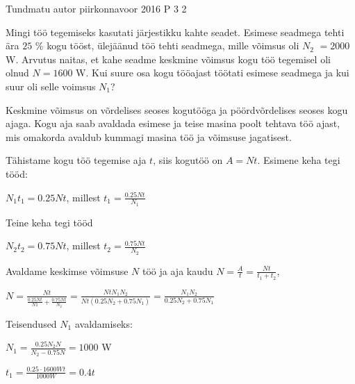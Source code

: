 {Tundmatu autor} %
{piirkonnavoor} %
{2016} %
{P 3} %
{2} %
{
\ifStatement
Mingi töö tegemiseks kasutati järjestikku kahte seadet. Esimese seadmega tehti ära $25$ \% kogu tööst, ülejäänud töö tehti seadmega, mille võimsus oli $N_2$ $= 2000$ W. Arvutus naitas, et kahe seadme keskmine võimsus kogu töö tegemisel oli olnud $N = 1600$ W. Kui suure osa kogu tööajast töötati esimese seadmega ja kui suur oli selle voimsus $N_1$?
\fi


\ifHint
Keskmine võimsus on võrdelises seoses kogutööga ja pöördvõrdelises seoses kogu ajaga. Kogu aja saab avaldada esimese ja teise masina poolt tehtava töö ajast, mis omakorda avaldub kummagi masina töö ja võimsuse jagatisest.
\fi

\ifSolution
Tähistame kogu töö tegemise aja $t$, siis kogutöö on $A = Nt$. Esimene keha tegi tööd:
\begin{center}
$N_1 t_1 = 0.25Nt$, millest $t_1 = \frac{0.25Nt}{N_1}$
\end{center}
Teine keha tegi tööd
\begin{center}
$N_2t_2 = 0.75Nt$, millest $t_2 = \frac{0.75Nt}{N_2}$
\end{center}
Avaldame keskimse võimsuse $N$ töö ja aja kaudu $N = \frac{A}{t} = \frac{Nt}{t_1 + t_2}$,
\begin{center}
$N = \frac{Nt}{\frac{0.25Nt}{N1} + \frac{0.75Nt}{N_2}} = \frac{NtN_1 N_2}{Nt(0.25N_2 + 0.75N_1)} = \frac{N_1 N_2}{0.25N_2 + 0.75 N_1}$
\end{center}
Teisendused $N_1$ avaldamiseks:
\begin{center}
$N_1 = \frac{0.25N_2 N}{N_2 - 0.75N} = 1000$ W
\end{center}
\begin{center}
$t_1 = \frac{0.25 \cdot 1600 Wt}{1000 W} = 0.4t$
\end{center}
\fi
}